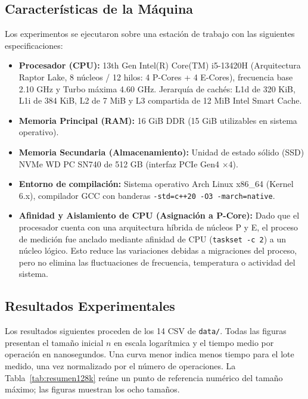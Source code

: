 \documentclass[11pt,letterpaper]{article}
\begin{document}
\subsection{Características de la Máquina}
Los experimentos se ejecutaron sobre una estación de trabajo con las siguientes especificaciones:
\begin{itemize}
    \item \textbf{Procesador (CPU):} 13th Gen Intel(R) Core(TM) i5-13420H (Arquitectura Raptor Lake, 8 núcleos / 12 hilos: 4 P-Cores + 4 E-Cores), frecuencia base 2.10 GHz y Turbo máxima 4.60 GHz. Jerarquía de cachés: L1d de 320 KiB, L1i de 384 KiB, L2 de 7 MiB y L3 compartida de 12 MiB Intel Smart Cache.
    \item \textbf{Memoria Principal (RAM):} 16 GiB DDR (15 GiB utilizables en sistema operativo).
    \item \textbf{Memoria Secundaria (Almacenamiento):} Unidad de estado sólido (SSD) NVMe WD PC SN740 de 512 GB (interfaz PCIe Gen4 $\times$4).
    \item \textbf{Entorno de compilación:} Sistema operativo Arch Linux x86\_64 (Kernel 6.x), compilador GCC con banderas \texttt{-std=c++20 -O3 -march=native}.
    \item \textbf{Afinidad y Aislamiento de CPU (Asignación a P-Core):} 
    Dado que el procesador cuenta con una arquitectura híbrida de núcleos P y E, el proceso de medición fue anclado mediante afinidad de CPU (\texttt{taskset -c 2}) a un núcleo lógico. Esto reduce las variaciones debidas a migraciones del proceso, pero no elimina las fluctuaciones de frecuencia, temperatura o actividad del sistema.
\end{itemize}

\subsection{Resultados Experimentales}

Los resultados siguientes proceden de los 14 CSV de \texttt{data/}. Todas las
figuras presentan el tamaño inicial $n$ en escala logarítmica y el tiempo
medio por operación en nanosegundos. Una curva menor indica menos tiempo
para el lote medido, una vez normalizado por el número de operaciones. La
Tabla~\ref{tab:resumen128k} reúne un punto de referencia numérico del tamaño
máximo; las figuras muestran los ocho tamaños.
\end{document}
